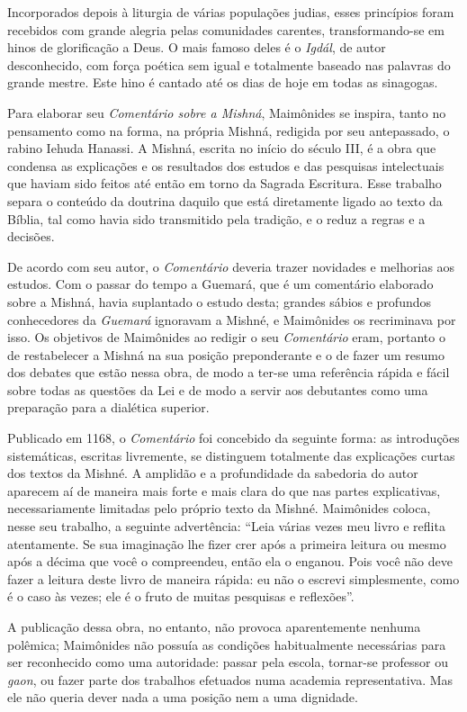 Incorporados depois à liturgia de várias populações judias, esses
princípios foram recebidos com grande alegria pelas comunidades
carentes, transformando-se em hinos de glorificação a Deus. O mais
famoso deles é o \emph{Igdál}, de autor desconhecido, com força poética sem
igual e totalmente baseado nas palavras do grande mestre. Este hino é
cantado até os dias de hoje em todas as sinagogas.

Para elaborar seu \emph{Comentário sobre a Mishná}, Maimônides se
inspira, tanto no pensamento como na forma, na própria Mishná,
redigida por seu antepassado, o rabino Iehuda Hanassi. A Mishná, escrita no
início do século III, é a obra que condensa as explicações e os
resultados dos estudos e das pesquisas intelectuais que haviam sido
feitos até então em torno da Sagrada Escritura. Esse trabalho separa o
conteúdo da doutrina daquilo que está diretamente ligado ao texto da
Bíblia, tal como havia sido transmitido pela tradição, e o reduz a
regras e a decisões.

De acordo com seu autor, o \emph{Comentário} deveria trazer novidades e
melhorias aos estudos. Com o passar do tempo a Guemará, que é um
comentário elaborado sobre a Mishná, havia suplantado o estudo
desta; grandes sábios e profundos conhecedores da \emph{Guemará}
ignoravam a Mishné, e Maimônides os recriminava por isso. Os
objetivos de Maimônides ao redigir o seu \emph{Comentário} eram,
portanto o de restabelecer a Mishná na sua posição preponderante
e o de fazer um resumo dos debates que estão nessa obra, de modo a
ter-se uma referência rápida e fácil sobre todas as questões da Lei e de
modo a servir aos debutantes como uma preparação para a dialética
superior.

Publicado em 1168, o \emph{Comentário} foi concebido da seguinte forma:
as introduções sistemáticas, escritas livremente, se distinguem
totalmente das explicações curtas dos textos da Mishné. A
amplidão e a profundidade da sabedoria do autor aparecem aí de maneira
mais forte e mais clara do que nas partes explicativas, necessariamente
limitadas pelo próprio texto da Mishné. Maimônides coloca, nesse
seu trabalho, a seguinte advertência: ``Leia várias vezes meu livro e
reflita atentamente. Se sua imaginação lhe fizer crer após a primeira
leitura ou mesmo após a décima que você o compreendeu, então ela o
enganou. Pois você não deve fazer a leitura deste livro de maneira
rápida: eu não o escrevi simplesmente, como é o caso às vezes; ele é o
fruto de muitas pesquisas e reflexões''.

A publicação dessa obra, no entanto, não provoca aparentemente nenhuma
polêmica; Maimônides não possuía as condições habitualmente necessárias
para ser reconhecido como uma autoridade: passar pela escola, tornar-se
professor ou \emph{gaon}, ou fazer parte dos trabalhos efetuados numa academia
representativa. Mas ele não queria dever nada a uma posição nem a uma
dignidade.

